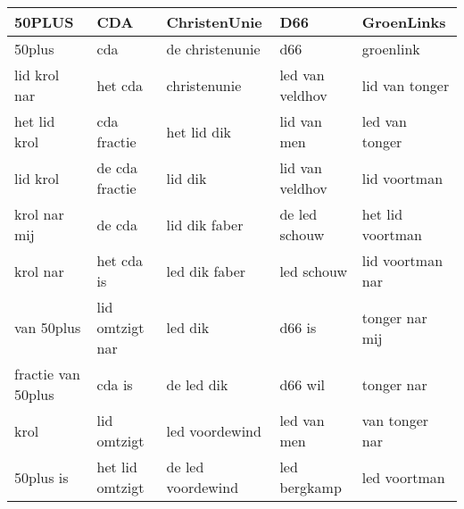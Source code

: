 \begin{tabular}{lllll}
\toprule
             50PLUS &              CDA &       ChristenUnie &              D66 &        GroenLinks \\
\midrule
             50plus &              cda &    de christenunie &              d66 &         groenlink \\
       lid krol nar &          het cda &       christenunie &  led van veldhov &    lid van tonger \\
       het lid krol &      cda fractie &        het lid dik &      lid van men &    led van tonger \\
           lid krol &   de cda fractie &            lid dik &  lid van veldhov &      lid voortman \\
       krol nar mij &           de cda &      lid dik faber &    de led schouw &  het lid voortman \\
           krol nar &       het cda is &      led dik faber &       led schouw &  lid voortman nar \\
         van 50plus &  lid omtzigt nar &            led dik &           d66 is &    tonger nar mij \\
 fractie van 50plus &           cda is &         de led dik &          d66 wil &        tonger nar \\
               krol &      lid omtzigt &     led voordewind &      led van men &    van tonger nar \\
          50plus is &  het lid omtzigt &  de led voordewind &     led bergkamp &      led voortman \\
\bottomrule
\end{tabular}
